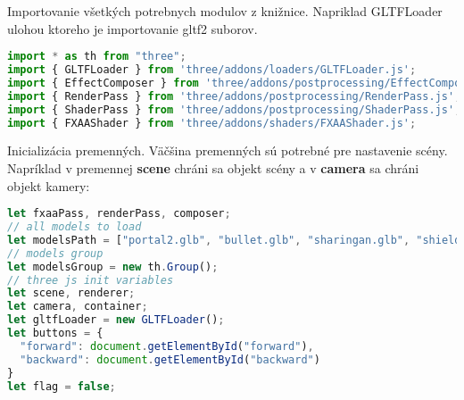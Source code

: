           Importovanie všetkých potrebnych modulov z knižnice. Napriklad GLTFLoader ulohou ktoreho je importovanie gltf2 suborov.
\begin{lstlisting}[language=JavaScript]
import * as th from "three";
import { GLTFLoader } from 'three/addons/loaders/GLTFLoader.js'; 
import { EffectComposer } from 'three/addons/postprocessing/EffectComposer.js';
import { RenderPass } from 'three/addons/postprocessing/RenderPass.js';
import { ShaderPass } from 'three/addons/postprocessing/ShaderPass.js';
import { FXAAShader } from 'three/addons/shaders/FXAAShader.js';
\end{lstlisting}

          Inicializácia premenných. Väčšina premenných sú potrebné pre nastavenie scény. Napríklad v premennej \textbf{scene} chráni sa objekt scény a v \textbf{camera} sa chráni objekt kamery:
\begin{lstlisting}[language=javascript]
let fxaaPass, renderPass, composer;
// all models to load
let modelsPath = ["portal2.glb", "bullet.glb", "sharingan.glb", "shieldBattery.glb", "triquetra.glb", "thor.glb"]
// models group
let modelsGroup = new th.Group();
// three js init variables
let scene, renderer;
let camera, container;
let gltfLoader = new GLTFLoader();
let buttons = {
  "forward": document.getElementById("forward"),
  "backward": document.getElementById("backward")
}
let flag = false;
\end{lstlisting}

